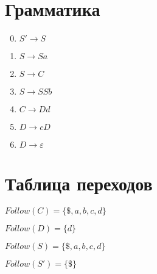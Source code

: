 \documentclass[12pt]{article}
\begin{document}
\section*{Грамматика}

\begin{enumerate}
\setcounter{enumi}{-1}
\item $S' \rightarrow S$
\item $S \rightarrow Sa$
\item $S \rightarrow C$
\item $S \rightarrow SSb$
\item $C \rightarrow Dd$
\item $D \rightarrow cD$
\item $D \rightarrow \varepsilon$
\end{enumerate}

\section*{Таблица переходов}

$Follow(C) = \{ \$, a, b, c, d \}$

$Follow(D) = \{ d \}$

$Follow(S) = \{ \$, a, b, c, d \}$

$Follow(S') = \{ \$ \}$

\bigbreak
\end{document}
